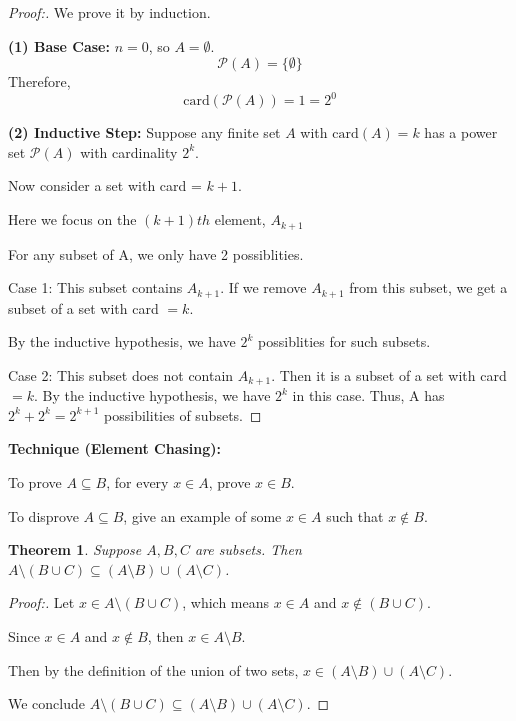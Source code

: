 \documentclass[12pt]{article}
\newtheorem{theorem}{Theorem}[section]
\begin{document}
\begin{proof}[Proof:]
    We prove it by induction.

    \textbf{(1) Base Case:} $n = 0$, so $A = \emptyset$. 
    \[ \mathcal{P}(A) = \{\emptyset\} \]
    Therefore, 
    \[ \text{card}(\mathcal{P}(A)) = 1 = 2^0 \]
    
    \textbf{(2) Inductive Step:} Suppose any finite set $A$ with $\text{card}(A) = k$ has a power set $\mathcal{P}(A)$ with cardinality $2^k$.

    Now consider a set with card = $k + 1$.

    Here we focus on the $(k + 1)th$ element, $A_{k + 1}$

    For any subset of A, we only have 2 possiblities.

    Case 1: This subset contains $A_{k + 1}$. If we remove $A_{k + 1}$ from this subset, we get a subset of a set with card $= k$.

    By the inductive hypothesis, we have $2^k$ possiblities for such subsets.

    Case 2: This subset does not contain $A_{k + 1}$. Then it is a subset of a set with card $= k$. By the inductive hypothesis, we have $2^k$ in this case. Thus, A has $2^k + 2^k = 2^{k+1}$ possibilities of subsets.
\end{proof}

\medbreak

\textbf{Technique (Element Chasing): }

To prove $A \subseteq B$, for every $x \in A$, prove $x \in B$.

To disprove $A \subseteq B$, give an example of some $x \in A$ such that $x \notin B$.

\medbreak

\begin{theorem}
    Suppose $A, B, C$ are subsets. Then $A \setminus (B \cup C) \subseteq (A \setminus B) \cup (A \setminus C)$.
\end{theorem}

\begin{proof}[Proof:]
    Let $x \in A \setminus (B \cup C)$, which means $x \in A$ and $x \notin (B \cup C)$.

    Since $x \in A$ and $x \notin B$, then $x \in A \setminus B$.

    Then by the definition of the union of two sets, $x \in (A \setminus B) \cup (A \setminus C)$.

    We conclude $A \setminus (B \cup C) \subseteq (A \setminus B) \cup (A \setminus C)$.
\end{proof}
\end{document}
